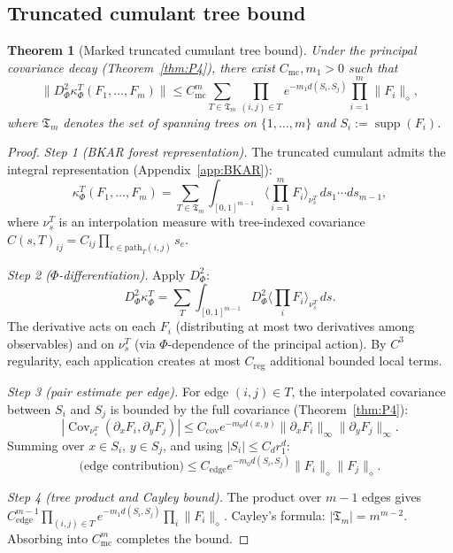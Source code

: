 \documentclass[12pt]{article}
\theoremstyle{plain}
\newtheorem{theorem}{Theorem}[section]
\theoremstyle{definition}
\numberwithin{equation}{section}
\newcommand{\Cov}{\operatorname{Cov}}
\newcommand{\supp}{\operatorname{supp}}
\begin{document}
\subsection{Truncated cumulant tree bound}

\begin{theorem}[Marked truncated cumulant tree bound]\label{thm:treebound}
Under the principal covariance decay (Theorem~\ref{thm:P4}), there exist $C_{\mathrm{mc}},m_1>0$ such that
\begin{equation}
\|D_\Phi^2\kappa_\Phi^T(F_1,\ldots,F_m)\| \leq C_{\mathrm{mc}}^m\sum_{T\in\mathfrak{T}_m}\prod_{(i,j)\in T}e^{-m_1 d(S_i,S_j)}\prod_{i=1}^m\|F_i\|_\diamond,
\end{equation}
where $\mathfrak{T}_m$ denotes the set of spanning trees on $\{1,\ldots,m\}$ and $S_i:=\supp(F_i)$.
\end{theorem}

\begin{proof}
\emph{Step 1 (BKAR forest representation).}  The truncated cumulant admits the integral representation (Appendix~\ref{app:BKAR}):
\begin{equation}
\kappa_\Phi^T(F_1,\ldots,F_m) = \sum_{T\in\mathfrak{T}_m}\int_{[0,1]^{m-1}}\Big\langle\prod_{i=1}^m F_i\Big\rangle_{\nu_s^T}\,ds_1\cdots ds_{m-1},
\end{equation}
where $\nu_s^T$ is an interpolation measure with tree-indexed covariance $C(s,T)_{ij}=C_{ij}\prod_{e\in\mathrm{path}_T(i,j)}s_e$.

\emph{Step 2 ($\Phi$-differentiation).}  Apply $D_\Phi^2$:
\begin{equation}
D_\Phi^2\kappa_\Phi^T = \sum_T\int_{[0,1]^{m-1}}D_\Phi^2\Big\langle\prod_i F_i\Big\rangle_{\nu_s^T}\,ds.
\end{equation}
The derivative acts on each $F_i$ (distributing at most two derivatives among observables) and on $\nu_s^T$ (via $\Phi$-dependence of the principal action).  By $C^3$ regularity, each application creates at most $C_{\mathrm{reg}}$ additional bounded local terms.

\emph{Step 3 (pair estimate per edge).}  For edge $(i,j)\in T$, the interpolated covariance between $S_i$ and $S_j$ is bounded by the full covariance (Theorem~\ref{thm:P4}):
\begin{equation}
|\Cov_{\nu_s^T}(\partial_x F_i,\partial_y F_j)|\leq C_{\mathrm{cov}}e^{-m_0 d(x,y)}\|\partial_x F_i\|_\infty\|\partial_y F_j\|_\infty.
\end{equation}
Summing over $x\in S_i$, $y\in S_j$, and using $|S_i|\leq C_d r_1^d$:
\begin{equation}
\text{(edge contribution)}\leq C_{\mathrm{edge}}e^{-m_0 d(S_i,S_j)}\|F_i\|_\diamond\|F_j\|_\diamond.
\end{equation}

\emph{Step 4 (tree product and Cayley bound).}  The product over $m-1$ edges gives $C_{\mathrm{edge}}^{m-1}\prod_{(i,j)\in T}e^{-m_1 d(S_i,S_j)}\prod_i\|F_i\|_\diamond$.  Cayley's formula: $|\mathfrak{T}_m|=m^{m-2}$.  Absorbing into $C_{\mathrm{mc}}^m$ completes the bound.
\end{proof}
\end{document}
